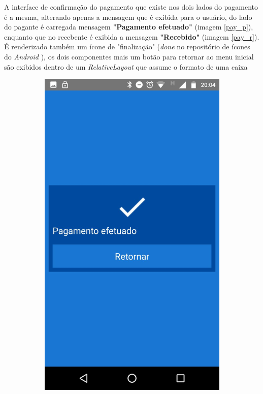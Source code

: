 \documentclass[hidelinks,12pt]{article}
\begin{document}
A interface de confirma\c{c}\~ao do pagamento que existe nos dois lados do pagamento \'e a mesma, alterando apenas a mensagem que \'e exibida para o usu\'ario, do lado do pagante \'e carregada mensagem \textbf{"Pagamento efetuado"} (imagem \ref{pay_p}), enquanto que no recebente \'e exibida a mensagem \textbf{"Recebido"} (imagem \ref{pay_r}). É renderizado tamb\'em um \'icone de "finaliza\c{c}\~ao" (\textit{done} no reposit\'orio de \'icones do \textit{Android} \cite{materialicon}), os dois componentes mais um bot\~ao para retornar ao menu inicial s\~ao exibidos dentro de um \textit{RelativeLayout} que assume o formato de uma caixa
\begin{figure}[H]
	\begin{subfigure}{0.5\textwidth}
		\includegraphics[scale=0.3]{pay_ok} 

\end{subfigure}
\end{figure}
\end{document}

